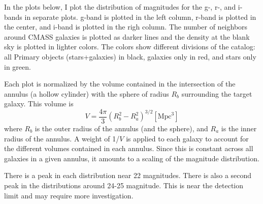 \documentclass[10pt]{article}
\begin{document}
 
In the plots below, I plot the distribution of magnitudes for the g-, r-, and i- bands in separate plots. g-band is plotted in the left column, r-band is plotted in the center, and i-band is plotted in the righ column. The number of neighbors around CMASS galaxies is plotted as darker lines and the density at the blank sky is plotted in lighter colors. The colors show different divisions of the catalog: all Primary objects (stars+galaxies) in black, galaxies only   
in  red, and stars only in green. 

Each plot is normalized by the volume contained in the intersection of the annulus (a hollow cylinder) with the sphere of radius $R_b$ surrounding the target galaxy. This volume is 
\begin{equation}
V= \dfrac{4\pi}{3}(R_b^2 - R_a^2)^{3/2} [\mathrm{Mpc}^3]
\end{equation}
where $R_b$ is the outer radius of the annulus (and the sphere), and $R_a$ is the inner radius of the annulus. 
A weight of 1/$V$ is applied to each galaxy to account for the different volumes contained in each annulus. 
Since this is constant across all galaxies in a given annulus, it amounts to a scaling of the magnitude distribution.
 
There is a peak in each distribution near 22 magnitudes. There is also a second peak in the distributions around 24-25 magnitude. 
This is near the detection limit and may require more investigation.
\end{document}
